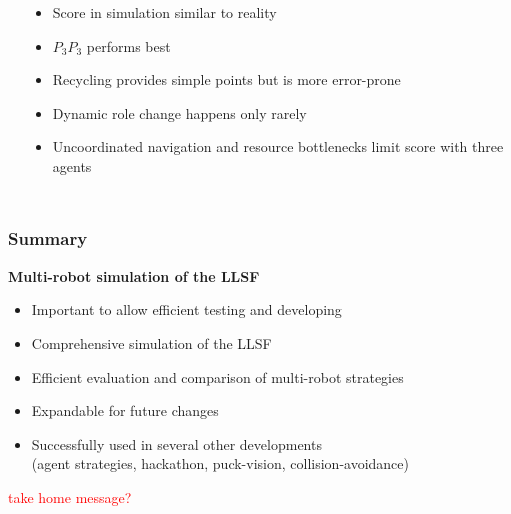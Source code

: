 \documentclass[]{beamer}
\begin{document}
\begin{frame}
\begin{columns}
\begin{overlayarea}{\textwidth}{0.8\textheight}
    \raggedright
    \end{overlayarea}
    \begin{itemize}
    \item Score in simulation similar to reality %
      \pause
    \item $P_3P_3$ performs best %
      \pause
    \item Recycling provides simple points but is more error-prone
      \pause
    \item Dynamic role change happens only rarely
      \pause
    \item Uncoordinated navigation and resource bottlenecks limit score with three agents
    \end{itemize}
  \end{columns}
\end{frame}


\begin{frame}
  \frametitle{Summary}
  \textbf{\large Multi-robot simulation of the LLSF}
  \begin{itemize}
  \item Important to allow efficient testing and developing
  \item Comprehensive simulation of the LLSF
  \item Efficient evaluation and comparison of multi-robot strategies
  \item Expandable for future changes
  \item Successfully used in several other developments\\(agent strategies, hackathon, puck-vision, collision-avoidance)
  \end{itemize}
  \begin{block}{}
    \textcolor{red}{take home message?}
  \end{block}
\end{frame}
\end{document}
